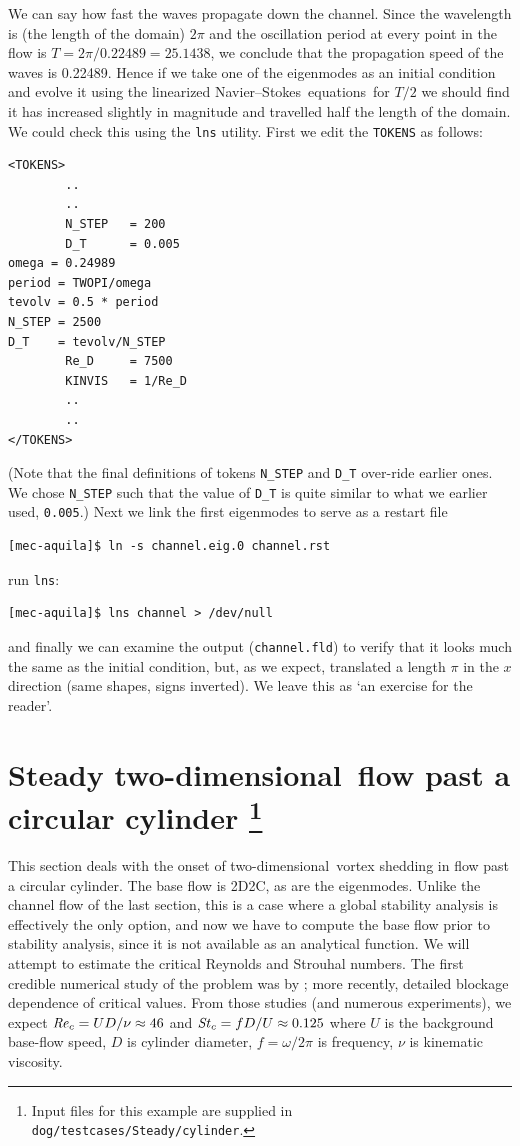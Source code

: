 \documentclass[11pt,a4paper]{report}
\newcommand\Rey{\mbox{\textit{Re}}}
\newcommand\Str{\mbox{\textit{St}}}
\newcommand\NavSto{Navier--Stokes}
\newcommand\LNS{linearized \NavSto}
\newcommand\LNSE{\LNS\ equations}
\newcommand\twod{two-di\-men\-sion\-al}
\begin{document}
We can say how fast the waves propagate down the channel.  Since the
wavelength is (the length of the domain) $2\pi$ and the oscillation
period at every point in the flow is $T=2\pi/0.22489=25.1438$, we
conclude that the propagation speed of the waves is 0.22489.  Hence if
we take one of the eigenmodes as an initial condition and evolve it
using the \LNSE\ for $T/2$ we should find it has increased slightly in
magnitude and travelled half the length of the domain.  We could check
this using the \verb+lns+ utility.  First we edit the \verb+TOKENS+ as
follows:
{\small
\begin{verbatim}
<TOKENS>
        ..
        ..
        N_STEP   = 200
        D_T      = 0.005
omega = 0.24989
period = TWOPI/omega
tevolv = 0.5 * period
N_STEP = 2500
D_T    = tevolv/N_STEP
        Re_D     = 7500
        KINVIS   = 1/Re_D
        ..
        ..
</TOKENS>
\end{verbatim}
} \noindent (Note that the final definitions of tokens \verb+N_STEP+
and \verb+D_T+ over-ride earlier ones. We chose \verb+N_STEP+ such
that the value of \verb+D_T+ is quite similar to what we earlier used,
\verb+0.005+.)  Next we link the first eigenmodes to serve as a
restart file {\small
\begin{verbatim}
[mec-aquila]$ ln -s channel.eig.0 channel.rst
\end{verbatim}
}
\noindent
run \verb+lns+:
{\small
\begin{verbatim}
[mec-aquila]$ lns channel > /dev/null
\end{verbatim}
}
\noindent and finally we can examine the output (\verb+channel.fld+)
to verify that it looks much the same as the initial condition, but,
as we expect, translated a length $\pi$ in the $x$ direction (same
shapes, signs inverted). We leave this as `an exercise for the
reader'.

\section{Steady \twod\ flow past a circular cylinder
\protect\footnote{Input files for this example are supplied in
  \texttt{dog/testcases/Steady/cylinder}.}  }
\label{sec.cyl2d}

This section deals with the onset of \twod\ vortex shedding in flow
past a circular cylinder.  The base flow is 2D2C, as are the
eigenmodes.  Unlike the channel flow of the last section, this is a
case where a global stability analysis is effectively the only option,
and now we have to compute the base flow prior to stability analysis,
since it is not available as an analytical function.  We will attempt
to estimate the critical Reynolds and Strouhal numbers.  The first
credible numerical study of the problem was by \citet{jack87}; more
recently, \citet{kumi06} detailed blockage dependence of critical
values.  From those studies (and numerous experiments), we expect
$\Rey_c=UD/\nu\approx46$ and $\Str_c=fD/U\approx0.125$ where $U$ is
the background base-flow speed, $D$ is cylinder diameter,
$f=\omega/2\pi$ is frequency, $\nu$ is kinematic viscosity.
\end{document}
